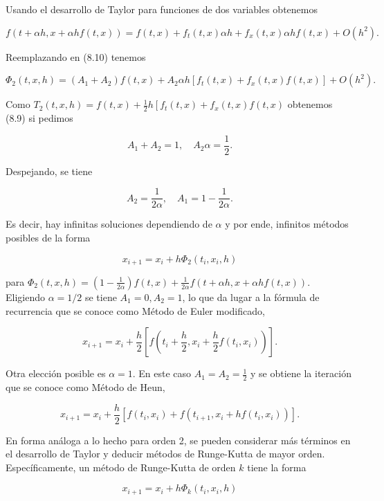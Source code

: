 \documentclass[10pt]{book}
\begin{document}
Usando el desarrollo de Taylor para funciones de dos variables obtenemos

$$
f(t+\alpha h, x+\alpha h f(t, x))=f(t, x)+f_{t}(t, x) \alpha h+f_{x}(t, x) \alpha h f(t, x)+O\left(h^{2}\right) .
$$

Reemplazando en (8.10) tenemos

$$
\Phi_{2}(t, x, h)=\left(A_{1}+A_{2}\right) f(t, x)+A_{2} \alpha h\left[f_{t}(t, x)+f_{x}(t, x) f(t, x)\right]+O\left(h^{2}\right) .
$$

Como $T_{2}(t, x, h)=f(t, x)+\frac{1}{2} h\left[f_{t}(t, x)+f_{x}(t, x) f(t, x)\right.$ obtenemos (8.9) si pedimos

$$
A_{1}+A_{2}=1, \quad A_{2} \alpha=\frac{1}{2} .
$$

Despejando, se tiene

$$
A_{2}=\frac{1}{2 \alpha}, \quad A_{1}=1-\frac{1}{2 \alpha} .
$$

Es decir, hay infinitas soluciones dependiendo de $\alpha$ y por ende, infinitos métodos posibles de la forma

$$
x_{i+1}=x_{i}+h \Phi_{2}\left(t_{i}, x_{i}, h\right)
$$

para $\Phi_{2}(t, x, h)=\left(1-\frac{1}{2 \alpha}\right) f(t, x)+\frac{1}{2 \alpha} f(t+\alpha h, x+\alpha h f(t, x))$.\\
Eligiendo $\alpha=1 / 2$ se tiene $A_{1}=0, A_{2}=1$, lo que da lugar a la fórmula de recurrencia que se conoce como Método de Euler modificado,


\begin{equation*}
x_{i+1}=x_{i}+\frac{h}{2}\left[f\left(t_{i}+\frac{h}{2}, x_{i}+\frac{h}{2} f\left(t_{i}, x_{i}\right)\right)\right] . \tag{8.11}
\end{equation*}


Otra elección posible es $\alpha=1$. En este caso $A_{1}=A_{2}=\frac{1}{2}$ y se obtiene la iteración que se conoce como Método de Heun,


\begin{equation*}
x_{i+1}=x_{i}+\frac{h}{2}\left[f\left(t_{i}, x_{i}\right)+f\left(t_{i+1}, x_{i}+h f\left(t_{i}, x_{i}\right)\right)\right] . \tag{8.12}
\end{equation*}


En forma análoga a lo hecho para orden 2, se pueden considerar más términos en el desarrollo de Taylor y deducir métodos de Runge-Kutta de mayor orden. Específicamente, un método de Runge-Kutta de orden $k$ tiene la forma

$$
x_{i+1}=x_{i}+h \Phi_{k}\left(t_{i}, x_{i}, h\right)
$$
\end{document}
